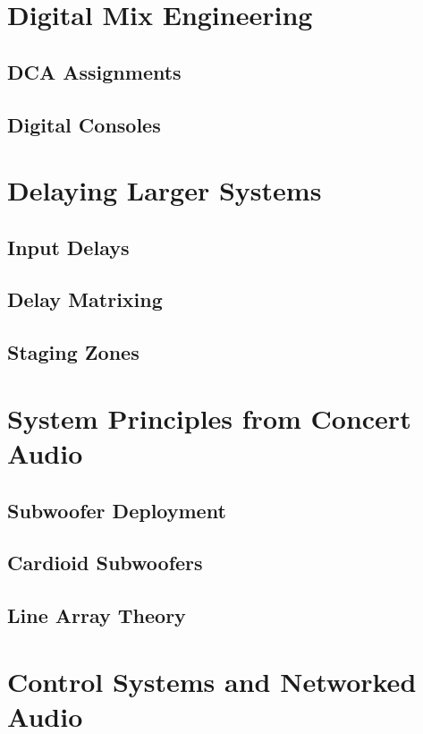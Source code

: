 \documentclass[a4paper]{article}
\begin{document}
\section{Digital Mix Engineering}

\subsection{DCA Assignments}

\subsection{Digital Consoles}

\section{Delaying Larger Systems}

\subsection{Input Delays}

\subsection{Delay Matrixing}

\subsection{Staging Zones}

\section[Concert Audio]{System Principles from Concert Audio}

\subsection{Subwoofer Deployment}

\subsection{Cardioid Subwoofers}

\subsection{Line Array Theory}

\section[Control Systems]{Control Systems and Networked Audio}
\end{document}

